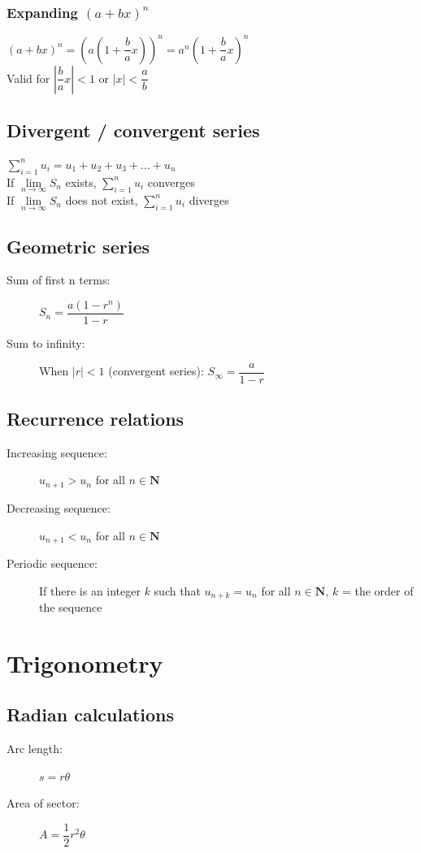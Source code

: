 \documentclass[A4paper]{article}
\begin{document}
	\subsubsection{Expanding $(a+bx)^n$}
	$(a+bx)^n = (a(1+\dfrac{b}{a}x))^n = a^n(1+\dfrac{b}{a}x)^n$\\
	Valid for $|\dfrac{b}{a}x|<1$ or $|x| < \dfrac{a}{b}$
	\subsection{Divergent / convergent series}
	$\sum\limits_{i=1}^{n} u_i = u_1+u_2+u_3+\dots+u_n$\\
	If $\lim\limits_{n \to \infty}S_n$ exists, $\sum\limits_{i=1}^{n} u_i$ converges\\
	If $\lim\limits_{n \to \infty}S_n$ does not exist, $\sum\limits_{i=1}^{n} u_i$ diverges
	\subsection{Geometric series}
	\begin{description}
		\item [Sum of first n terms:]$S_n = \dfrac{a(1-r^n)}{1-r}$
		\item [Sum to infinity:] When $|r|<1$ (convergent series): $S_\infty = \dfrac{a}{1-r}$
	\end{description}

	\subsection{Recurrence relations}
	\begin{description}
		\item[Increasing sequence:] $u_{n+1}>u_n$ for all $n\in \mathbf{N}$
		\item[Decreasing sequence:] $u_{n+1}<u_n$ for all $n\in \mathbf{N}$
		\item[Periodic sequence:] If there is an integer $k$ such that $u_{n+k}=u_n$ for all $n\in \mathbf{N}$, $k$ = the order of the sequence
	\end{description}

	\pagebreak

	\section{Trigonometry}
	\subsection{Radian calculations}
	\begin{description}
		\item[Arc length:] $s=r\theta$
		\item[Area of sector:] $A=\dfrac{1}{2}r^2\theta$
	\end{description}
\end{document}

